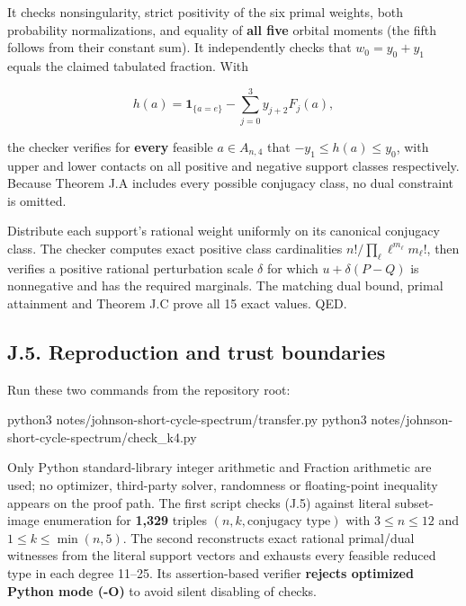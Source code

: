 \documentclass[
  11pt,
]{article}
\newenvironment{Shaded}{}{}
\newcommand{\ExtensionTok}[1]{#1}
\newcommand{\NormalTok}[1]{#1}
\begin{document}
It checks nonsingularity, strict positivity of the six primal weights,
both probability normalizations, and equality of \textbf{all five}
orbital moments (the fifth follows from their constant sum). It
independently checks that \(w_0=y_0+y_1\) equals the claimed tabulated
fraction. With

\[
h(a)=\mathbf1_{\{a=e\}}-\sum_{j=0}^3 y_{j+2}F_j(a),
\]

the checker verifies for \textbf{every} feasible \(a\in A_{n,4}\) that
\(-y_1\le h(a)\le y_0\), with upper and lower contacts on all positive
and negative support classes respectively. Because Theorem J.A includes
every possible conjugacy class, no dual constraint is omitted.

Distribute each support's rational weight uniformly on its canonical
conjugacy class. The checker computes exact positive class cardinalities
\(n!/\prod_\ell\ell^{m_\ell}m_\ell!\), then verifies a positive rational
perturbation scale \(\delta\) for which \(u+\delta(P-Q)\) is nonnegative
and has the required marginals. The matching dual bound, primal
attainment and Theorem J.C prove all 15 exact values. QED.

\subsection{J.5. Reproduction and trust
boundaries}\label{j.5.-reproduction-and-trust-boundaries}

Run these two commands from the repository root:

\begin{Shaded}
\begin{Highlighting}[]
\ExtensionTok{python3}\NormalTok{ notes/johnson{-}short{-}cycle{-}spectrum/transfer.py}
\ExtensionTok{python3}\NormalTok{ notes/johnson{-}short{-}cycle{-}spectrum/check\_k4.py}
\end{Highlighting}
\end{Shaded}

Only Python standard-library integer arithmetic and Fraction arithmetic
are used; no optimizer, third-party solver, randomness or floating-point
inequality appears on the proof path. The first script checks (J.5)
against literal subset-image enumeration for \textbf{1,329} triples
\((n,k,\text{conjugacy type})\) with \(3\le n\le12\) and
\(1\le k\le\min(n,5)\). The second reconstructs exact rational
primal/dual witnesses from the literal support vectors and exhausts
every feasible reduced type in each degree 11--25. Its assertion-based
verifier \textbf{rejects optimized Python mode (-O)} to avoid silent
disabling of checks.
\end{document}
